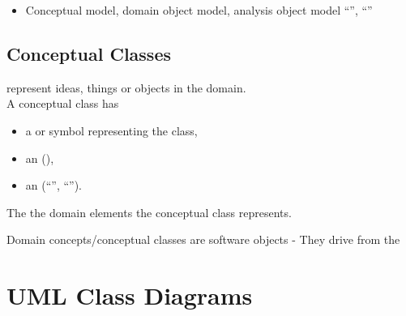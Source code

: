 \begin{defBox}[title=Synonyms for Domain Model]
    \begin{itemize}
        \item Conceptual model, domain object model, analysis object model \enquote{}, \enquote{}
    \end{itemize}
\end{defBox}

\subsection{Conceptual Classes}
\begin{defBox}[title=Conceputal class \enquote{Konzeptklasse}]
     represent ideas, things or objects in the domain.\\
    A conceptual class has
    \begin{itemize}
        \item a  or symbol representing the class,
        \item an  (\endquote{}),
        \item an  (\enquote{}, \enquote{}).
    \end{itemize}
    The   the domain elements the conceptual class represents.
\end{defBox}
\begin{defBox}
    Domain concepts/conceptual classes are  software objects - They drive from the 
\end{defBox}

\section{UML Class Diagrams}
